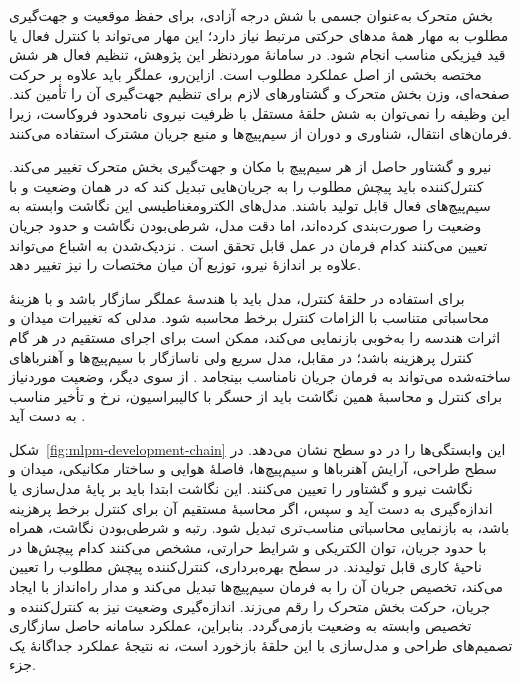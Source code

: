 بخش متحرک به‌عنوان جسمی با شش درجه آزادی، برای حفظ موقعیت و جهت‌گیری مطلوب به مهار همهٔ مدهای حرکتی مرتبط نیاز دارد؛ این مهار می‌تواند با کنترل فعال یا قید فیزیکی مناسب انجام شود. در سامانهٔ موردنظر این پژوهش، تنظیم فعال هر شش مختصه بخشی از اصل عملکرد مطلوب است. ازاین‌رو، عملگر باید علاوه بر حرکت صفحه‌ای، وزن بخش متحرک و گشتاورهای لازم برای تنظیم جهت‌گیری آن را تأمین کند. این وظیفه را نمی‌توان به شش حلقهٔ مستقل با ظرفیت نیروی نامحدود فروکاست، زیرا فرمان‌های انتقال، شناوری و دوران از سیم‌پیچ‌ها و منبع جریان مشترک استفاده می‌کنند.

نیرو و گشتاور حاصل از هر سیم‌پیچ با مکان و جهت‌گیری بخش متحرک تغییر می‌کند. کنترل‌کننده باید پیچش مطلوب را به جریان‌هایی تبدیل کند که در همان وضعیت و با سیم‌پیچ‌های فعال قابل تولید باشند. مدل‌های الکترومغناطیسی این نگاشت وابسته به وضعیت را صورت‌بندی کرده‌اند، اما دقت مدل، شرطی‌بودن نگاشت و حدود جریان تعیین می‌کنند کدام فرمان در عمل قابل تحقق است \cite{jansenModelingMagneticallyLevitated2007,hu6DOFExtendedUnified2024,liuOptimizedRealTimeCurrent2026}. نزدیک‌شدن به اشباع می‌تواند علاوه بر اندازهٔ نیرو، توزیع آن میان مختصات را نیز تغییر دهد.

برای استفاده در حلقهٔ کنترل، مدل باید با هندسهٔ عملگر سازگار باشد و با هزینهٔ محاسباتی متناسب با الزامات کنترل برخط محاسبه شود. مدلی که تغییرات میدان و اثرات هندسه را به‌خوبی بازنمایی می‌کند، ممکن است برای اجرای مستقیم در هر گام کنترل پرهزینه باشد؛ در مقابل، مدل سریع ولی ناسازگار با سیم‌پیچ‌ها و آهنرباهای ساخته‌شده می‌تواند به فرمان جریان نامناسب بینجامد \cite{hu6DOFExtendedUnified2024,nakataCompensationFEMBased2026}. از سوی دیگر، وضعیت موردنیاز برای کنترل و محاسبهٔ همین نگاشت باید از حسگر با کالیبراسیون، نرخ و تأخیر مناسب به دست آید \cite{curtisstewartImplementationModularMagnetic2023}.

شکل~\ref{fig:mlpm-development-chain} این وابستگی‌ها را در دو سطح نشان می‌دهد. در سطح طراحی، آرایش آهنرباها و سیم‌پیچ‌ها، فاصلهٔ هوایی و ساختار مکانیکی، میدان و نگاشت نیرو و گشتاور را تعیین می‌کنند. این نگاشت ابتدا باید بر پایهٔ مدل‌سازی یا اندازه‌گیری به دست آید و سپس، اگر محاسبهٔ مستقیم آن برای کنترل برخط پرهزینه باشد، به بازنمایی محاسباتی مناسب‌تری تبدیل شود. رتبه و شرطی‌بودن نگاشت، همراه با حدود جریان، توان الکتریکی و شرایط حرارتی، مشخص می‌کنند کدام پیچش‌ها در ناحیهٔ کاری قابل تولیدند. در سطح بهره‌برداری، کنترل‌کننده پیچش مطلوب را تعیین می‌کند، تخصیص جریان آن را به فرمان سیم‌پیچ‌ها تبدیل می‌کند و مدار راه‌انداز با ایجاد جریان، حرکت بخش متحرک را رقم می‌زند. اندازه‌گیری وضعیت نیز به کنترل‌کننده و تخصیص وابسته به وضعیت بازمی‌گردد. بنابراین، عملکرد سامانه حاصل سازگاری تصمیم‌های طراحی و مدل‌سازی با این حلقهٔ بازخورد است، نه نتیجهٔ عملکرد جداگانهٔ یک جزء.

